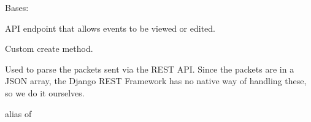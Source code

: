 \documentclass[letterpaper,10pt,english]{sphinxmanual}
\begin{document}
\begin{fulllineitems}
\label{modules/microdata:microdata.views.EventViewSet}
Bases: 

API endpoint that allows events to be viewed or edited.

\begin{fulllineitems}
\label{modules/microdata:microdata.views.EventViewSet.create}
Custom create method.

Used to parse the packets sent via the REST API. Since the packets are in a JSON array,
the Django REST Framework has no native way of handling these, so we do it ourselves.

\end{fulllineitems}


\begin{fulllineitems}
\label{modules/microdata:microdata.views.EventViewSet.queryset}
\end{fulllineitems}


\begin{fulllineitems}
\label{modules/microdata:microdata.views.EventViewSet.serializer_class}
alias of 

\end{fulllineitems}


\end{fulllineitems}

\end{document}
